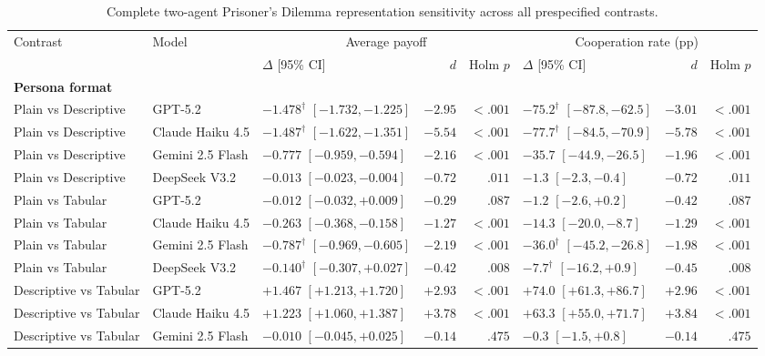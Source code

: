 \begin{table}[t]
\centering
\scriptsize
\setlength{\tabcolsep}{3pt}
\caption{Complete two-agent Prisoner's Dilemma representation sensitivity across all prespecified contrasts.}
\label{tab:appendix-pd-complete-sensitivity}
\begin{tabular}{llp{3.1cm}rrp{3.1cm}rr}
\toprule
Contrast & Model & \multicolumn{3}{c}{Average payoff} & \multicolumn{3}{c}{Cooperation rate (pp)} \\
\cmidrule(lr){3-5}\cmidrule(lr){6-8}
 & & $\Delta$ [95\% CI] & $d$ & Holm $p$ & $\Delta$ [95\% CI] & $d$ & Holm $p$ \\
\midrule
\multicolumn{8}{l}{\textbf{Persona format}} \\
Plain vs Descriptive & GPT-5.2 & $-1.478^{\dagger}$ $[-1.732, -1.225]$ & $-2.95$ & $<.001$ & $-75.2^{\dagger}$ $[-87.8, -62.5]$ & $-3.01$ & $<.001$ \\
Plain vs Descriptive & Claude Haiku 4.5 & $-1.487^{\dagger}$ $[-1.622, -1.351]$ & $-5.54$ & $<.001$ & $-77.7^{\dagger}$ $[-84.5, -70.9]$ & $-5.78$ & $<.001$ \\
Plain vs Descriptive & Gemini 2.5 Flash & $-0.777$ $[-0.959, -0.594]$ & $-2.16$ & $<.001$ & $-35.7$ $[-44.9, -26.5]$ & $-1.96$ & $<.001$ \\
Plain vs Descriptive & DeepSeek V3.2 & $-0.013$ $[-0.023, -0.004]$ & $-0.72$ & $.011$ & $-1.3$ $[-2.3, -0.4]$ & $-0.72$ & $.011$ \\
Plain vs Tabular & GPT-5.2 & $-0.012$ $[-0.032, +0.009]$ & $-0.29$ & $.087$ & $-1.2$ $[-2.6, +0.2]$ & $-0.42$ & $.087$ \\
Plain vs Tabular & Claude Haiku 4.5 & $-0.263$ $[-0.368, -0.158]$ & $-1.27$ & $<.001$ & $-14.3$ $[-20.0, -8.7]$ & $-1.29$ & $<.001$ \\
Plain vs Tabular & Gemini 2.5 Flash & $-0.787^{\dagger}$ $[-0.969, -0.605]$ & $-2.19$ & $<.001$ & $-36.0^{\dagger}$ $[-45.2, -26.8]$ & $-1.98$ & $<.001$ \\
Plain vs Tabular & DeepSeek V3.2 & $-0.140^{\dagger}$ $[-0.307, +0.027]$ & $-0.42$ & $.008$ & $-7.7^{\dagger}$ $[-16.2, +0.9]$ & $-0.45$ & $.008$ \\
Descriptive vs Tabular & GPT-5.2 & $+1.467$ $[+1.213, +1.720]$ & $+2.93$ & $<.001$ & $+74.0$ $[+61.3, +86.7]$ & $+2.96$ & $<.001$ \\
Descriptive vs Tabular & Claude Haiku 4.5 & $+1.223$ $[+1.060, +1.387]$ & $+3.78$ & $<.001$ & $+63.3$ $[+55.0, +71.7]$ & $+3.84$ & $<.001$ \\
Descriptive vs Tabular & Gemini 2.5 Flash & $-0.010$ $[-0.045, +0.025]$ & $-0.14$ & $.475$ & $-0.3$ $[-1.5, +0.8]$ & $-0.14$ & $.475$ \\

\end{tabular}
\end{table}
